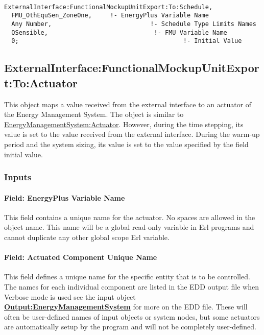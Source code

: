 \begin{lstlisting}

ExternalInterface:FunctionalMockupUnitExport:To:Schedule,
  FMU_OthEquSen_ZoneOne,     !- EnergyPlus Variable Name
  Any Number,                           !- Schedule Type Limits Names
  QSensible,                             !- FMU Variable Name
  0;                                             !- Initial Value
\end{lstlisting}

\subsection{ExternalInterface:FunctionalMockupUnitExport:To:Actuator}\label{externalinterfacefunctionalmockupunitexporttoactuator}

This object maps a value received from the external interface to an actuator of the Energy Management System. The object is similar to \hyperref[energymanagementsystemactuator]{EnergyManagementSystem:Actuator}. However, during the time stepping, its value is set to the value received from the external interface. During the warm-up period and the system sizing, its value is set to the value specified by the field initial value.

\subsubsection{Inputs}\label{inputs-11-004}

\paragraph{Field: EnergyPlus Variable Name}\label{field-energyplus-variable-name-6}

This field contains a unique name for the actuator. No spaces are allowed in the object name. This name will be a global read-only variable in Erl programs and cannot duplicate any other global scope Erl variable.

\paragraph{Field: Actuated Component Unique Name}\label{field-actuated-component-unique-name-2}

This field defines a unique name for the specific entity that is to be controlled. The names for each individual component are listed in the EDD output file when Verbose mode is used see the input object \textbf{\hyperref[outputenergymanagementsystem]{Output:EnergyManagementSystem}} for more on the EDD file. These will often be user-defined names of input objects or system nodes, but some actuators are automatically setup by the program and will not be completely user-defined.

